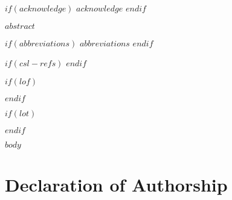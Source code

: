 \documentclass[a4paper,12pt]{article}
\begin{document}
$if(acknowledge)$
\newpage
$acknowledge$
$endif$
\pagestyle{plain}
\setcounter{page}{1}    %

\newpage
$abstract$

\newpage
\tableofcontents
\clearpage

$if(abbreviations)$
\newpage
$abbreviations$
$endif$

$if(csl-refs)$
\newlength{\cslhangindent}
\setlength{\cslhangindent}{1.5em}
\newenvironment{CSLReferences}%
  {$if(csl-hanging-indent)$\setlength{\parindent}{0pt}%
  \everypar{\setlength{\hangindent}{\cslhangindent}}\ignorespaces$endif$}%
  {\par}
$endif$ 

$if(lof)$
\newpage
\listoffigures
{}
$endif$

$if(lot)$
\newpage
\listoftables
{}
$endif$

\newpage
\pagestyle{plain}       
\setcounter{page}{1}    %

$body$



\newpage
\thispagestyle{empty}
\hypertarget{declaration-of-authorship}{%
\section*{Declaration of Authorship}\label{declaration-of-authorship}}
\end{document}
